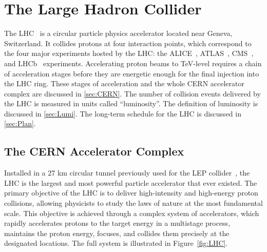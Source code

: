 \chapter{The Large Hadron Collider}
\label{chap:LHC}

The \ac{LHC}~\cite{Evans:2008zzb} is a circular particle physics accelerator located near Geneva, Switzerland. It collides protons at four interaction points, which correspond to the four major experiments hosted by the \ac{LHC}: the \ac{ALICE}~\cite{ALICE:2008ngc}, \ac{ATLAS}~\cite{ATLAS:2008xda}, \ac{CMS}~\cite{CMS:2008xjf}, and \ac{LHCb}~\cite{LHCb:2008vvz} experiments. Accelerating proton beams to TeV-level requires a chain of acceleration stages before they are energetic enough for the final injection into the \ac{LHC} ring. These stages of acceleration and the whole \ac{CERN} accelerator complex are discussed in \autoref{sec:CERN}. The number of collision events delivered by the \ac{LHC} is measured in units called ``luminosity''. The definition of luminosity is discussed in \autoref{sec:Lumi}. The long-term schedule for the \ac{LHC} is discussed in \autoref{sec:Plan}.

\section{The CERN Accelerator Complex}
\label{sec:CERN}

Installed in a 27 km circular tunnel previously used for the \ac{LEP} collider~\cite{203828}, the \ac{LHC} is the largest and most powerful particle accelerator that ever existed. The primary objective of the \ac{LHC} is to deliver high-intensity and high-energy proton collisions, allowing physicists to study the laws of nature at the most fundamental scale. This objective is achieved through a complex system of accelerators, which rapidly accelerates protons to the target energy in a multistage process, maintains the proton energy, focuses, and collides them precisely at the designated locations. The full system is illustrated in Figure~\ref{fig:LHC}.

